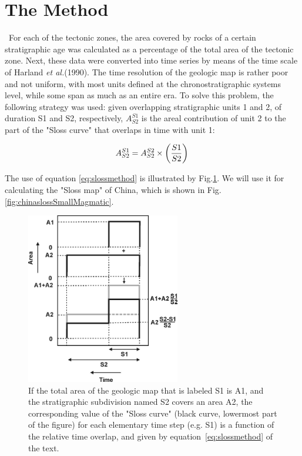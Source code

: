 \documentclass{article}
\begin{document}
 \section*{The Method} \label{sec:method}

 ~\indent For each of the tectonic  zones, the area covered by rocks of
 a certain  stratigraphic age  was calculated as  a percentage  of the
 total area  of the  tectonic zone.  Next,  these data  were converted
 into  time series  by means  of  the time  scale of  Harland {\it  et
 al.}(1990). The  time resolution of  the geologic map is  rather poor
 and not  uniform, with most units defined  at the chronostratigraphic
 systems level,  while some span as  much as an entire  era.  To solve
 this  problem, the  following  strategy was  used: given  overlapping
 stratigraphic units  1 and  2, of duration  S1 and  S2, respectively,
 $A^{S1}_{S2}$ is the areal contribution of  unit 2 to the part of the
 "Sloss curve" that overlaps in time with unit 1:

 \begin{equation}
   \label{eq:slossmethod}
     A^{S1}_{S2} = A^{S2}_{S2} \times \left( \frac{S1}{S2} \right)\\
 \end{equation}

 \noindent The use of equation       \ref{eq:slossmethod}      
 is  illustrated by  Fig.\ref{fig:slossmethod}.   We will  use it  for
 calculating  the  "Sloss  map"  of  China, which  is  shown  in  Fig.
 \ref{fig:chinaslossSmallMagmatic}.\\

 \begin{figure}[here]
 \begin{center}
 \includegraphics[width=0.6\textwidth]{slossmethod.jpg}
 \caption[fig:slossmethod]{If the total area of 
 the  geologic map that  is labeled  S1 is  A1, and  the stratigraphic
 subdivision named  S2 covers an  area A2, the corresponding  value of
 the "Sloss  curve" (black  curve, lowermost part  of the  figure) for
 each elementary  time step  (e.g. S1) is  a function of  the relative
 time overlap, and given by equation~\ref{eq:slossmethod} of the text.
 }\label{fig:slossmethod}
 \end{center}
 \end{figure}
\end{document}
